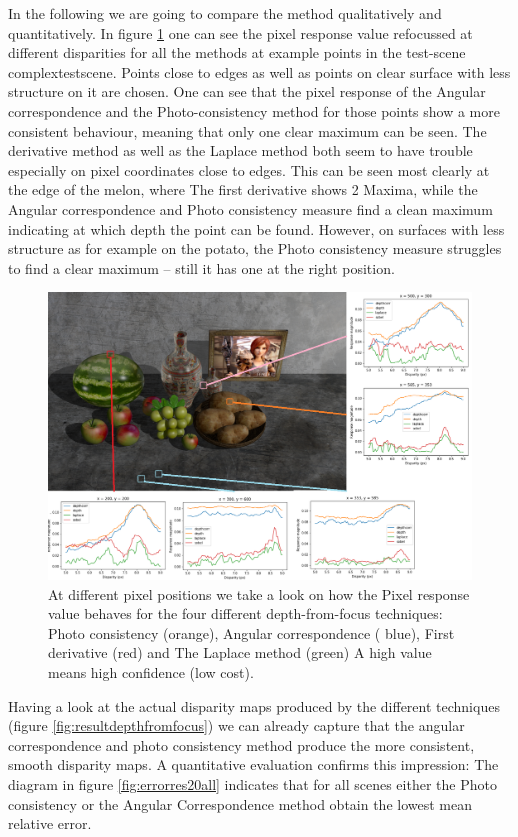 \documentclass  [
  paper    = a4,
  BCOR     = 10mm,
  twoside,
  fontsize = 12pt,
  fleqn,
  toc      = bibnumbered,
  toc      = listofnumbered,
  numbers  = noendperiod,
  headings = normal,
  listof   = leveldown,
  version  = 3.03
]                                       {scrreprt}
\begin{document}
	In the following we are going to compare the method qualitatively and quantitatively. In figure \ref{fig:originalmarked} one can see the pixel response value refocussed at different disparities for all the methods at example points in the test-scene \glqq complextestscene\grqq. Points close to edges as well as points on clear surface with less structure on it are chosen. One can see that the pixel response of the Angular correspondence and the Photo-consistency method for those points show a more consistent behaviour, meaning that only one clear maximum can be seen. The derivative method as well as the Laplace method both seem to have trouble especially on pixel coordinates close to edges. This can be seen most clearly at the edge of the melon, where The first derivative shows 2 Maxima, while the Angular correspondence and Photo consistency measure find a clean maximum indicating at which depth the point can be found. However, on surfaces with less structure as for example on the potato, the Photo consistency measure struggles to find a clear maximum -- still it has one at the right position. 
	\begin{figure}
		\centering
		\includegraphics[width=1\linewidth]{images/original_marked}
		\caption[Pixel response for depth from focus techniques]{At different pixel positions we take a look on how the Pixel response value behaves for the four different depth-from-focus techniques: Photo consistency (orange), Angular correspondence ( blue), First derivative (red) and The Laplace method (green) A high value means high confidence (low cost).}
		\label{fig:originalmarked}
	\end{figure}
	Having a look at the actual disparity maps produced by the different techniques (figure \ref{fig:resultdepthfromfocus}) we can already capture that the angular correspondence and photo consistency method produce the more consistent, smooth disparity maps. A quantitative evaluation confirms this impression:
	The diagram in figure \ref{fig:errorres20all} indicates that for all scenes either the Photo consistency or the Angular Correspondence method obtain the lowest mean relative error.
	
\end{document}
